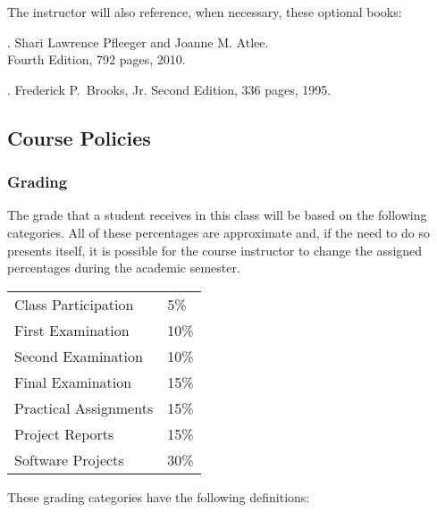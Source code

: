 \documentclass[11pt]{article}
\begin{document}
\noindent
The instructor will also reference, when necessary, these optional books:
%
\vspace*{.5em}

. Shari Lawrence Pfleeger and Joanne M. Atlee.\\
Fourth Edition, 792 pages, 2010.
%
\vspace*{.5em}

. Frederick P.\ Brooks, Jr.
Second Edition, 336 pages, 1995.

\subsection*{Course Policies}

\subsubsection*{Grading}

The grade that a student receives in this class will be based on the following categories. All of these percentages are
approximate and, if the need to do so presents itself, it is possible for the course instructor to change the assigned
percentages during the academic semester.

\begin{center}
  \begin{tabular}{ll}
    Class Participation        & 5\%  \\
    First Examination          & 10\% \\
    Second Examination         & 10\% \\
    Final Examination          & 15\% \\
    Practical Assignments      & 15\% \\
    Project Reports            & 15\% \\
    Software Projects          & 30\%
  \end{tabular}
\end{center}

\noindent
These grading categories have the following definitions:

\vspace*{-.05in}
\end{document}
